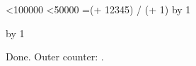 \documentclass{article}
\begin{document}
\newcount\outeri
\newcount\inneri
\newcount\dummy

\def\innerloop{%
  \ifnum\inneri<50000
    \dummy=\numexpr(\inneri*\outeri + 12345) / (\inneri + 1)\relax
    \advance\inneri by 1
    \expandafter\innerloop
  \fi
}

\def\outerloop{%
  \ifnum\outeri<100000
    \inneri=0
    \innerloop
    \advance\outeri by 1
    \expandafter\outerloop
  \fi
}

\outerloop

Done. Outer counter: \the\outeri.
\end{document}
